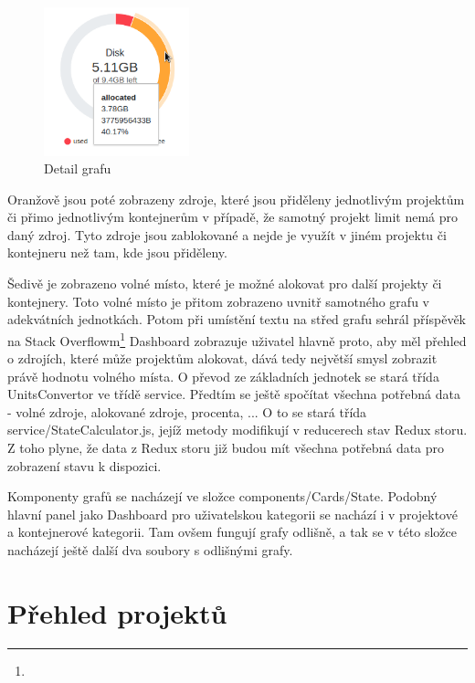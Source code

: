 \documentclass[a4paper,oneside,12pt]{report}
\begin{document}
\begin{figure}[h]
	\centering
	\includegraphics[height=4.3cm]{../img/tooltip.png}
	\caption[Detail grafu, vlastní tvorba]{Detail grafu}
	\label{fig:tootip}
\end{figure}

Oranžově jsou poté zobrazeny zdroje, které jsou přiděleny jednotlivým projektům či přimo jednotlivým kontejnerům v případě, že samotný projekt limit nemá pro daný zdroj.
Tyto zdroje jsou zablokované a nejde je využít v jiném projektu či kontejneru než tam, kde jsou přiděleny.

Šedivě je zobrazeno volné místo, které je možné alokovat pro další projekty či kontejnery.
Toto volné místo je přitom zobrazeno uvnitř samotného grafu v adekvátních jednotkách.
Potom při umístění textu na střed grafu sehrál příspěvěk na Stack Overflowm\footnote{}   Dashboard zobrazuje uživatel hlavně proto, aby měl přehled o zdrojích, které může projektům alokovat, dává tedy největší smysl zobrazit právě hodnotu volného místa.
O převod ze základních jednotek se stará třída UnitsConvertor ve třídě service.
Předtím se ještě spočítat všechna potřebná data - volné zdroje, alokované zdroje, procenta, ... O to se stará třída service/StateCalculator.js, jejíž metody modifikují v reducerech stav Redux storu.
Z toho plyne, že data z Redux storu již budou mít všechna potřebná data pro zobrazení stavu k dispozici.

Komponenty grafů se nacházejí ve složce components/Cards/State.
Podobný hlavní panel jako Dashboard pro uživatelskou kategorii se nachází i v projektové a kontejnerové kategorii.
Tam ovšem fungují grafy odlišně, a tak se v této složce nacházejí ještě další dva soubory s odlišnými grafy.
\newpage


\section{Přehled projektů}
\end{document}
